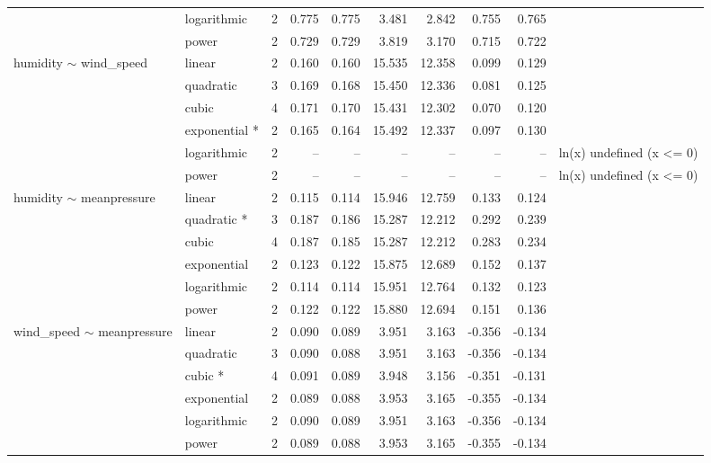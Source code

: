 \begin{table}[htbp]
{\begin{tabular}{llrrrrrrrl}
     & logarithmic & 2 & 0.775 & 0.775 & 3.481 & 2.842 & 0.755 & 0.765 &  \\
     & power & 2 & 0.729 & 0.729 & 3.819 & 3.170 & 0.715 & 0.722 &  \\
    humidity $\sim$ wind\_speed & linear & 2 & 0.160 & 0.160 & 15.535 & 12.358 & 0.099 & 0.129 &  \\
     & quadratic & 3 & 0.169 & 0.168 & 15.450 & 12.336 & 0.081 & 0.125 &  \\
     & cubic & 4 & 0.171 & 0.170 & 15.431 & 12.302 & 0.070 & 0.120 &  \\
     & exponential * & 2 & 0.165 & 0.164 & 15.492 & 12.337 & 0.097 & 0.130 &  \\
     & logarithmic & 2 & -- & -- & -- & -- & -- & -- & ln(x) undefined (x \textless{}= 0) \\
     & power & 2 & -- & -- & -- & -- & -- & -- & ln(x) undefined (x \textless{}= 0) \\
    humidity $\sim$ meanpressure & linear & 2 & 0.115 & 0.114 & 15.946 & 12.759 & 0.133 & 0.124 &  \\
     & quadratic * & 3 & 0.187 & 0.186 & 15.287 & 12.212 & 0.292 & 0.239 &  \\
     & cubic & 4 & 0.187 & 0.185 & 15.287 & 12.212 & 0.283 & 0.234 &  \\
     & exponential & 2 & 0.123 & 0.122 & 15.875 & 12.689 & 0.152 & 0.137 &  \\
     & logarithmic & 2 & 0.114 & 0.114 & 15.951 & 12.764 & 0.132 & 0.123 &  \\
     & power & 2 & 0.122 & 0.122 & 15.880 & 12.694 & 0.151 & 0.136 &  \\
    wind\_speed $\sim$ meanpressure & linear & 2 & 0.090 & 0.089 & 3.951 & 3.163 & -0.356 & -0.134 &  \\
     & quadratic & 3 & 0.090 & 0.088 & 3.951 & 3.163 & -0.356 & -0.134 &  \\
     & cubic * & 4 & 0.091 & 0.089 & 3.948 & 3.156 & -0.351 & -0.131 &  \\
     & exponential & 2 & 0.089 & 0.088 & 3.953 & 3.165 & -0.355 & -0.134 &  \\
     & logarithmic & 2 & 0.090 & 0.089 & 3.951 & 3.163 & -0.356 & -0.134 &  \\
     & power & 2 & 0.089 & 0.088 & 3.953 & 3.165 & -0.355 & -0.134 &  \\
    \bottomrule
  \end{tabular}}
\end{table}

